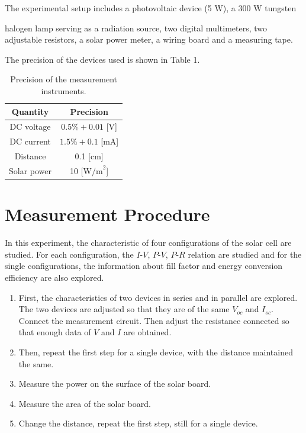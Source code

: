 \documentclass{article}
\begin{document}
The experimental setup includes a photovoltaic device (5 W), a 300 W tungsten{halogen lamp
serving as a radiation source, two digital multimeters, two adjustable resistors, a solar
power meter, a wiring board and a measuring tape.

The precision of the devices used is shown in Table 1.

\begin{table}[H]
    \centering
    \begin{tabular}{cc}
        \toprule
        Quantity    & Precision           \\
        \midrule
        DC voltage  & $0.5\% + 0.01$ [V]  \\
        DC current  & $1.5\% + 0.1$ [mA]  \\
        Distance    & 0.1 [cm]            \\
        Solar power & 10 [$\text{W/m}^2$] \\
        \bottomrule
    \end{tabular}
    \caption{Precision of the measurement instruments.}\label{tablePresicion}
\end{table}

\section{Measurement Procedure}
In this experiment, the characteristic of four configurations of the solar cell are studied. For each configuration, the $I$-$V$, $P$-$V$, $P$-$R$ relation are studied and for the single configurations, the information about fill factor and energy conversion efficiency are also explored.
\begin{enumerate}
    \item First, the characteristics of two devices in series and in parallel are explored. The two devices are adjusted so that they are of the same $V_{oc}$ and $I_{sc}$. Connect the measurement circuit. Then adjust the resistance connected so that enough data of $V$ and $I$ are obtained.
    \item Then, repeat the first step for a single device, with the distance maintained the same.
    \item Measure the power on the surface of the solar board.
    \item Measure the area of the solar board.
    \item  Change the distance, repeat the first step, still for a single device.
\end{enumerate}

}
\end{document}
